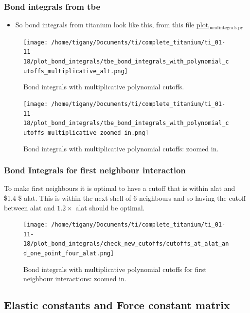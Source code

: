 \documentclass[11pt]{article}
\begin{document}
\subsubsection{Bond integrals from tbe}
\label{sec:org584cea7}
\begin{itemize}
\item So bond integrals from titanium look like this, from this file
\href{file:///home/tigany/Documents/ti/complete\_titanium/ti\_01-11-18/plot\_bond\_integrals/plot\_bond\_integrals.py}{plot\(_{\text{bond}}\)\(_{\text{integrals.py}}\)}
\end{itemize}
\begin{figure}[htbp]
\centering
\texttt{[image: /home/tigany/Documents/ti/complete\_titanium/ti\_01-11-18/plot\_bond\_integrals/tbe\_bond\_integrals\_with\_polynomial\_cutoffs\_multiplicative\_alt.png]}
\caption{\label{fig:org2e274ff}
Bond integrals with multiplicative polynomial cutoffs.}
\end{figure}
\begin{figure}[htbp]
\centering
\texttt{[image: /home/tigany/Documents/ti/complete\_titanium/ti\_01-11-18/plot\_bond\_integrals/tbe\_bond\_integrals\_with\_polynomial\_cutoffs\_multiplicative\_zoomed\_in.png]}
\caption{\label{fig:org8203fce}
Bond integrals with multiplicative polynomial cutoffs: zoomed in.}
\end{figure}

\subsubsection{Bond Integrals for first neighbour interaction}
\label{sec:org6d72b62}
To make first neighbours it is optimal to have a cutoff that is within
alat and \$1.4 \texttimes{} \$ alat. This is within the next shell of 6 neighbours
and so having the cutoff between alat and \(1.2\times\) alat should be
optimal. 
\begin{figure}[htbp]
\centering
\texttt{[image: /home/tigany/Documents/ti/complete\_titanium/ti\_01-11-18/plot\_bond\_integrals/check\_new\_cutoffs/cutoffs\_at\_alat\_and\_one\_point\_four\_alat.png]}
\caption{\label{fig:orgdc550b0}
Bond integrals with multiplicative polynomial cutoffs for first neighbour interactions: zoomed in.}
\end{figure}

\subsection{Elastic constants and Force constant matrix}
\label{sec:org2926868}
\end{document}
